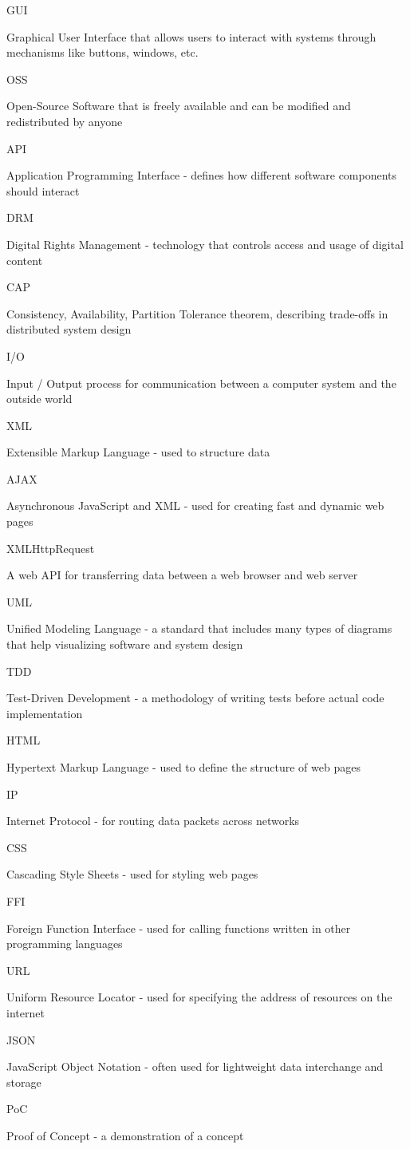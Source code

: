 \documentclass[]{final}
\begin{document}
GUI

Graphical User Interface that allows users to interact with systems through mechanisms like buttons, windows, etc.

OSS

Open-Source Software that is freely available and can be modified and redistributed by anyone

API

Application Programming Interface - defines how different software components should interact

DRM

Digital Rights Management - technology that controls access and usage of digital content

CAP

Consistency, Availability, Partition Tolerance theorem, describing trade-offs in distributed system design

I/O

Input / Output process for communication between a computer system and the outside world

XML

Extensible Markup Language - used to structure data

AJAX

Asynchronous JavaScript and XML - used for creating fast and dynamic web pages

XMLHttpRequest

A web API for transferring data between a web browser and web server

UML

Unified Modeling Language - a standard that includes many types of diagrams that help visualizing software and system design

TDD

Test-Driven Development - a methodology of writing tests before actual code implementation

HTML

Hypertext Markup Language - used to define the structure of web pages

IP

Internet Protocol - for routing data packets across networks

CSS

Cascading Style Sheets - used for styling web pages

FFI

Foreign Function Interface - used for calling functions written in other programming languages

URL

Uniform Resource Locator - used for specifying the address of resources on the internet

JSON

JavaScript Object Notation - often used for lightweight data interchange and storage

PoC

Proof of Concept - a demonstration of a concept
\end{document}
